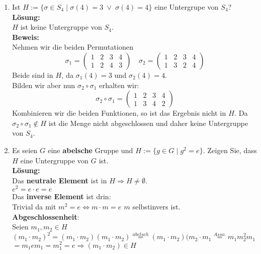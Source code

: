 \documentclass[11pt,a4paper,ngerman]{article}
\begin{document}
\begin{enumerate}[\bfseries a)]

\item Ist $H := \{ \sigma \in S_4 \; | \; \sigma (4) = 3  \; \lor \; \sigma (4) = 4 \}$ eine Untergrupe von $S_4$?\\

\textbf{Lösung:}\\

$H$ ist keine Untergruppe von $S_4$.\\
\textbf{Beweis:}\\

Nehmen wir die beiden Permutationen
$$
\sigma_1 = \begin{pmatrix} 1 & 2 & 3 & 4 \\ 1 & 2 & 4 & 3 \end{pmatrix} \quad  \sigma_2 = \begin{pmatrix} 1 & 2 & 3 & 4 \\ 1 & 3 & 2 & 4 \end{pmatrix}
$$
Beide sind in $H$, da $\sigma_1 (4) = 3$ und $\sigma_2 (4) = 4$.\\
Bilden wir aber nun $\sigma_2 \circ \sigma_1$ erhalten wir:
$$
\sigma_2 \circ \sigma_1 =  \begin{pmatrix} 1 & 2 & 3 & 4 \\ 1 & 3 & 4 & 2 \end{pmatrix}
$$
Kombinieren wir die beiden Funktionen, so ist das Ergebnis nicht in $H$. Da $\sigma_2 \circ \sigma_1 \not \in H$ ist die Menge nicht abgeschlossen und daher keine Untergruppe von $S_4$.
\item Es seien $G$ eine \textbf{abelsche} Gruppe und $H := \{ g \in G \; | \; g^2 = e \}$. Zeigen Sie, dass $H$ eine Untergruppe von $G$ ist.\\

\textbf{Lösung:}\\


Das \textbf{neutrale Element} ist in $H \Rightarrow H \not= \emptyset$.\\
$e^2 = e \cdot e = e$\\

Das \textbf{inverse Element} ist drin:\\
Trivial da mit $m^2 = e \Leftrightarrow m \cdot m = e$ $m$ selbstinvers ist.\\

\textbf{Abgeschlossenheit}:\\
Seien $m_1,m_2 \in H$\\
$(m_1 \cdot m_2)^2 = (m_1 \cdot m_2) (m_1 \cdot m_2) \stackrel{abelsch}{=} (m_1 \cdot m_2) (m_2 \cdot m_1 \stackrel{Asso.}{=} m_1 m_2^2 m_1$\\
$= m_1 e m_1 = m_1^2 = e \Rightarrow (m_1 \cdot m_2) \in H$


\end{enumerate}
\end{document}
